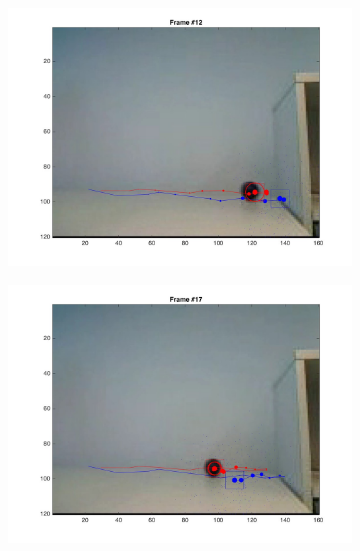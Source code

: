 \documentclass{ethz_report}
\begin{document}
\begin{figure}[h]
\begin{subfigure}[b]{.25\textwidth}
        \includegraphics[width=1\linewidth]{images/video3_model_11}
    \end{subfigure}%
    \begin{subfigure}[b]{.25\textwidth}
        \centering
        \includegraphics[width=1\linewidth]{images/video3_model_16}
    \end{subfigure}
    \begin{subfigure}[b]{.25\textwidth}
        \centering

\end{subfigure}
\end{figure}
\end{document}
